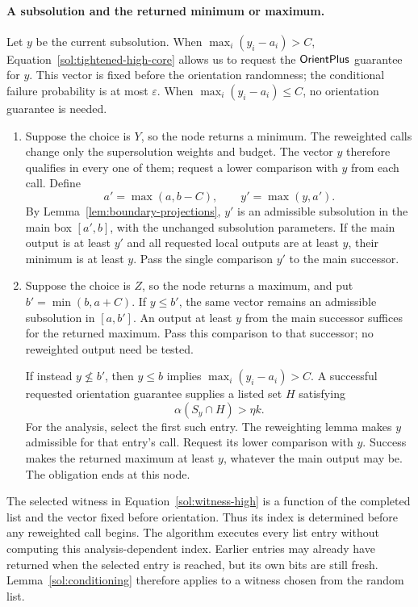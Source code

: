 \paragraph{A subsolution and the returned minimum or maximum.}
Let \(y\) be the current subsolution. When
\(\max_i(y_i-a_i)>C\), Equation~\eqref{sol:tightened-high-core}
allows us to request the \(\mathsf{OrientPlus}\) guarantee for \(y\).
This vector is fixed before the orientation randomness; the
conditional failure probability is at most \(\varepsilon\).
When \(\max_i(y_i-a_i)\le C\), no orientation guarantee is needed.

\begin{enumerate}[label=\textup{(\roman*)},leftmargin=*]
\item
Suppose the choice is \(Y\), so the node returns a minimum.
The reweighted calls change only the supersolution weights and
budget. The vector \(y\) therefore qualifies in every one of them;
request a lower comparison with \(y\) from each call. Define
\[
 a'=\max(a,b-C),\qquad y'=\max(y,a').
\]
By Lemma~\ref{lem:boundary-projections}, \(y'\) is an admissible
subsolution in the main box \([a',b]\), with the unchanged
subsolution parameters. If the main output is at least \(y'\) and
all requested local outputs are at least \(y\), their minimum is
at least \(y\). Pass the single comparison \(y'\) to the main
successor.

\item
Suppose the choice is \(Z\), so the node returns a maximum, and put
\(b'=\min(b,a+C)\). If \(y\le b'\), the same vector remains an
admissible subsolution in \([a,b']\). An output at least \(y\)
from the main successor suffices for the returned maximum. Pass this
comparison to that successor; no reweighted output need be tested.

If instead \(y\not\le b'\), then \(y\le b\) implies
\(\max_i(y_i-a_i)>C\). A successful requested orientation
guarantee supplies a listed set \(H\) satisfying
\begin{equation}
 \alpha(S_y\cap H)>\eta k.
 \label{sol:witness-high}
\end{equation}
For the analysis, select the first such entry. The reweighting lemma
makes \(y\) admissible for that entry's call. Request its lower
comparison with \(y\). Success makes the returned maximum at least
\(y\), whatever the main output may be. The obligation ends at
this node.
\end{enumerate}

The selected witness in Equation~\eqref{sol:witness-high} is a
function of the completed list and the vector fixed before orientation.
Thus its index is determined before any reweighted call begins.
The algorithm executes every list entry without computing this
analysis-dependent index. Earlier entries may already have returned
when the selected entry is reached, but its own bits are still fresh.
Lemma~\ref{sol:conditioning} therefore applies to a witness chosen
from the random list.

